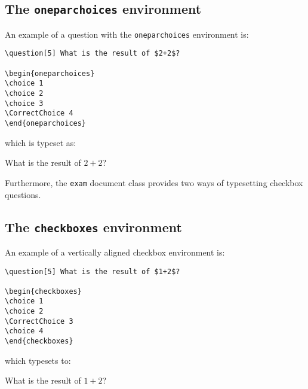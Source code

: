 \documentclass[12pt,a4paper]{exam}
\begin{document}
\subsection{The \texttt{oneparchoices} environment}

An example of a question with the \texttt{oneparchoices} environment is:

\begin{lstlisting}
\question[5] What is the result of $2+2$?

\begin{oneparchoices}
\choice 1
\choice 2
\choice 3
\CorrectChoice 4
\end{oneparchoices}
\end{lstlisting}

which is typeset as:

\begin{questions}
\setcounter{question}{1}
\question[5] What is the result of $2+2$?

\begin{oneparchoices}
\end{oneparchoices}
\end{questions}

Furthermore, the \texttt{exam} document class provides two ways of typesetting
checkbox questions.

\subsection{The \texttt{checkboxes} environment}

An example of a vertically aligned checkbox environment is:

\begin{lstlisting}
\question[5] What is the result of $1+2$?

\begin{checkboxes}
\choice 1
\choice 2
\CorrectChoice 3
\choice 4
\end{checkboxes}
\end{lstlisting}

which typesets to:

\begin{questions}
\setcounter{question}{2}
\question[5] What is the result of $1+2$?

\begin{checkboxes}
\end{checkboxes}
\end{questions}
\end{document}
